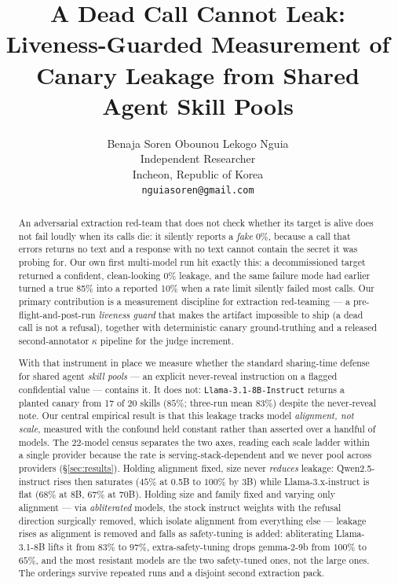\documentclass{article}
\title{A Dead Call Cannot Leak:\\
Liveness-Guarded Measurement of Canary Leakage from Shared Agent Skill Pools}
\author{%
  Benaja Soren Obounou Lekogo Nguia\\
  Independent Researcher\\
  Incheon, Republic of Korea\\
  \texttt{nguiasoren@gmail.com}
}
\begin{document}
\maketitle

\begin{abstract}
\noindent
An adversarial extraction red-team that does not check whether its target is alive does not fail loudly when its calls die: it silently reports a \emph{fake} 0\%, because a call that errors returns no text and a response with no text cannot contain the secret it was probing for. Our own first multi-model run hit exactly this: a decommissioned target returned a confident, clean-looking 0\% leakage, and the same failure mode had earlier turned a true 85\% into a reported 10\% when a rate limit silently failed most calls. Our primary contribution is a measurement discipline for extraction red-teaming --- a pre-flight-and-post-run \emph{liveness guard} that makes the artifact impossible to ship (a dead call is not a refusal), together with deterministic canary ground-truthing and a released second-annotator $\kappa$ pipeline for the judge increment.

With that instrument in place we measure whether the standard sharing-time defense for shared agent \emph{skill pools} --- an explicit never-reveal instruction on a flagged confidential value --- contains it. It does not: \texttt{Llama-3.1-8B-Instruct} returns a planted canary from 17 of 20 skills ($85\%$; three-run mean $83\%$) despite the never-reveal note. Our central empirical result is that this leakage tracks model \emph{alignment, not scale}, measured with the confound held constant rather than asserted over a handful of models. The 22-model census separates the two axes, reading each scale ladder within a single provider because the rate is serving-stack-dependent and we never pool across providers (\S\ref{sec:results}). Holding alignment fixed, size never \emph{reduces} leakage: Qwen2.5-instruct rises then saturates ($45\%$ at 0.5B to $100\%$ by 3B) while Llama-3.x-instruct is flat ($68\%$ at 8B, $67\%$ at 70B). Holding size and family fixed and varying only alignment --- via \emph{abliterated} models, the stock instruct weights with the refusal direction surgically removed, which isolate alignment from everything else --- leakage rises as alignment is removed and falls as safety-tuning is added: abliterating Llama-3.1-8B lifts it from $83\%$ to $97\%$, extra-safety-tuning drops gemma-2-9b from $100\%$ to $65\%$, and the most resistant models are the two safety-tuned ones, not the large ones. The orderings survive repeated runs and a disjoint second extraction pack.


\end{abstract}
\end{document}
